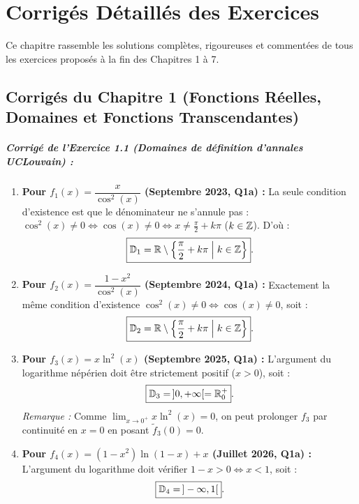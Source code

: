 \chapter{Corrigés Détaillés des Exercices}

Ce chapitre rassemble les solutions complètes, rigoureuses et commentées de tous les exercices proposés à la fin des Chapitres 1 à 7.

\section{Corrigés du Chapitre 1 (Fonctions Réelles, Domaines et Fonctions Transcendantes)}

\paragraph{Corrigé de l'Exercice 1.1 (Domaines de définition d'annales UCLouvain) :}
\begin{enumerate}[label=(\alph*)]
    \item \textbf{Pour $f_1(x) = \dfrac{x}{\cos^2(x)}$ (Septembre 2023, Q1a) :} La seule condition d'existence est que le dénominateur ne s'annule pas : $\cos^2(x) \neq 0 \iff \cos(x) \neq 0 \iff x \neq \frac{\pi}{2} + k\pi$ ($k \in \mathbb{Z}$). D'où :
    \[
        \boxed{\mathbb{D}_1 = \mathbb{R} \setminus \left\{ \frac{\pi}{2} + k\pi \;\middle|\; k \in \mathbb{Z} \right\}}.
    \]
    \item \textbf{Pour $f_2(x) = \dfrac{1-x^2}{\cos^2(x)}$ (Septembre 2024, Q1a) :} Exactement la même condition d'existence $\cos^2(x) \neq 0 \iff \cos(x) \neq 0$, soit :
    \[
        \boxed{\mathbb{D}_2 = \mathbb{R} \setminus \left\{ \frac{\pi}{2} + k\pi \;\middle|\; k \in \mathbb{Z} \right\}}.
    \]
    \item \textbf{Pour $f_3(x) = x\ln^2(x)$ (Septembre 2025, Q1a) :} L'argument du logarithme népérien doit être strictement positif ($x > 0$), soit :
    \[
        \boxed{\mathbb{D}_3 = \,]0, +\infty[ = \mathbb{R}_0^+}.
    \]
    \emph{Remarque :} Comme $\lim_{x \to 0^+} x\ln^2(x) = 0$, on peut prolonger $f_3$ par continuité en $x = 0$ en posant $\tilde{f}_3(0) = 0$.
    \item \textbf{Pour $f_4(x) = (1-x^2)\ln(1-x) + x$ (Juillet 2026, Q1a) :} L'argument du logarithme doit vérifier $1 - x > 0 \iff x < 1$, soit :
    \[
        \boxed{\mathbb{D}_4 = \,]-\infty, 1[}.
    \]
\end{enumerate}

